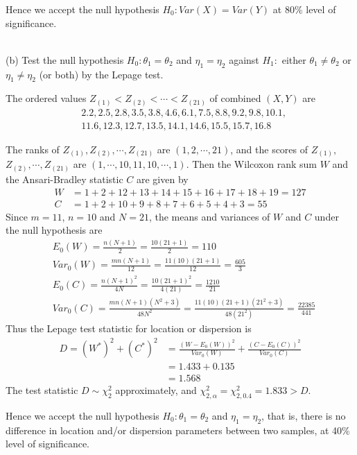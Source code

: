 \documentclass[12pt,a4paper]{article}
\begin{document}
Hence we accept the null hypothesis $H_{0}:Var(X)=Var(Y)$ at 80\% level of significance.

~\\
(b) Test the null hypothesis $H_{0}:\theta_{1}=\theta_{2}$ and $\eta_{1}=\eta_{2}$ against $H_{1}:$ either $\theta_{1}\neq \theta_{2}$ or $\eta_{1} \neq \eta_{2}$ (or both) by the Lepage test.

The ordered values $Z_{(1)}<Z_{(2)}<\cdots<Z_{(21)}$ of combined $(X,Y)$ are 
\begin{align*}
&2.2, 2.5, 2.8, 3.5, 3.8, 4.6, 6.1, 7.5, 8.8, 9.2, 9.8, 10.1,\\
&11.6, 12.3, 12.7, 13.5, 14.1, 14.6, 15.5, 15.7, 16.8
\end{align*}

The ranks of $Z_{(1)},Z_{(2)},\cdots,Z_{(21)}$ are $(1, 2,\cdots,21)$, and the scores of $Z_{(1)},$\\$Z_{(2)},\cdots,Z_{(21)}$ are $(1,\cdots,10,11,10,\cdots,1)$. Then the Wilcoxon rank sum $W$ and the Ansari-Bradley statistic $C$ are given by
\begin{align*}
W&=1+2+12+13+14+15+16+17+18+19=127\\
C&=1+2+10+9+8+7+6+5+4+3=55
\end{align*}
Since $m=11$, $n=10$ and $N=21$, the means and variances of $W$ and $C$ under the null hypothesis are 
\begin{align*}
&E_{0}(W)=\frac{n(N+1)}{2}=\frac{10(21+1)}{2}=110\\
&Var_{0}(W)=\frac{mn(N+1)}{12}=\frac{11(10)(21+1)}{12}=\frac{605}{3}\\
&E_{0}(C)=\frac{n(N+1)^{2}}{4N}=\frac{10(21+1)^{2}}{4(21)}=\frac{1210}{21}\\
&Var_{0}(C)=\frac{mn(N+1)(N^{2}+3)}{48N^{2}}=\frac{11(10)(21+1)(21^{2}+3)}{48(21^{2})}=\frac{22385}{441}
\end{align*}
Thus the Lepage test statistic for location or dispersion is
\begin{align*}
D=(W^{*})^{2}+(C^{*})^{2}&=\frac{(W-E_{0}(W))^{2}}{Var_{0}(W)}+\frac{(C-E_{0}(C))^{2}}{Var_{0}(C)}\\
&=1.433+0.135\\
&=1.568
\end{align*}
The test statistic $D\sim \chi_{2}^{2}$ approximately, and $\chi_{2,\alpha}^{2}=\chi_{2,0.4}^{2}=1.833>D$.

Hence we accept the null hypothesis $H_{0}:\theta_{1}=\theta_{2}$ and $\eta_{1}=\eta_{2}$, that is, there is no difference in location and/or dispersion parameters between two samples, at 40\% level of significance.
\end{document}
